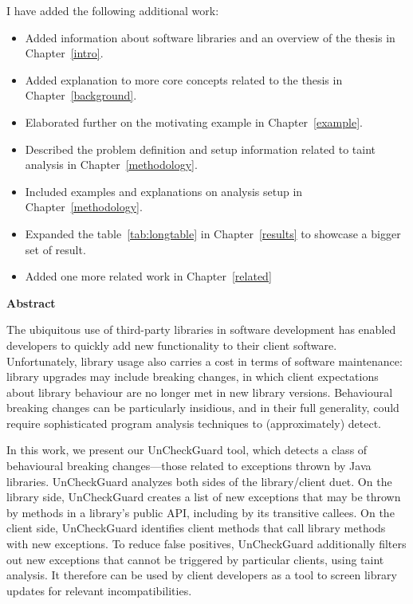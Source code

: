 I have added the following additional work:

\begin{itemize}
  \item Added information about software libraries and an overview of the thesis in Chapter~\ref{intro}.
  \item Added explanation to more core concepts related to the thesis in Chapter~\ref{background}.
  \item Elaborated further on the motivating example in Chapter~\ref{example}.
  \item Described the problem definition and setup information related to taint analysis in Chapter~\ref{methodology}.
  \item Included examples and explanations on analysis setup in Chapter~\ref{methodology}.
  \item Expanded the table~\ref{tab:longtable} in Chapter~\ref{results} to showcase a bigger set of result.
  \item Added one more related work in Chapter~\ref{related}
\end{itemize}

\cleardoublepage
{}    %

\begin{center}\textbf{Abstract}\end{center}

      The ubiquitous use of third-party libraries in software development has enabled developers to quickly add
      new functionality to their client software. Unfortunately, library usage also carries a cost in
      terms of software maintenance: library upgrades may include breaking changes, in which client expectations
      about library behaviour are no longer met in new library versions. Behavioural breaking
      changes can be particularly insidious, and in their full generality, could require sophisticated program
      analysis techniques to (approximately) detect.

      In this work, we present our UnCheckGuard tool, which detects a class of behavioural breaking changes---those
      related to exceptions thrown by Java libraries. UnCheckGuard analyzes both sides of the library/client
      duet. On the library side, UnCheckGuard creates a list of new exceptions that may be thrown by methods
      in a library's public API, including by its transitive callees. On the client side, UnCheckGuard identifies
      client methods that call library methods with new exceptions. To reduce false positives, UnCheckGuard
      additionally filters out new exceptions that cannot be triggered by particular clients, using taint analysis. It therefore can be
      used by client developers as a tool to screen library updates for relevant incompatibilities.

